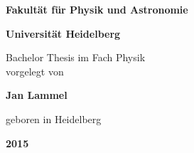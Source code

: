 \begin{center}
%

	\textbf{Fakultät für Physik und Astronomie} \\
	
	\vspace{0.5cm}
	
	\textbf{Universität Heidelberg}
	
	
	\vfill
	
	
	Bachelor Thesis im Fach Physik \\
	
	vorgelegt von \\
	
	\vspace{1cm}
	
	\textbf{Jan Lammel} \\
	
	
	\vspace{1cm}
	
	geboren in Heidelberg \\
	
	\vspace{0.7cm}
	
	\textbf{2015}


\end{center}        





\newpage